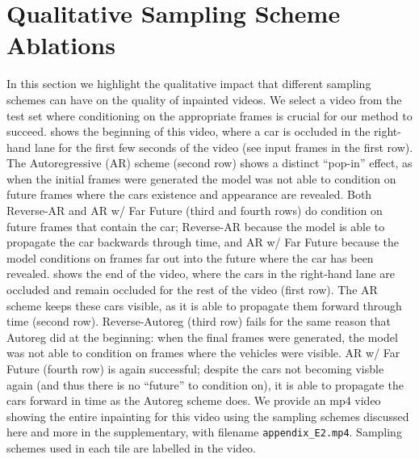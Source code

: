 \section{Qualitative Sampling Scheme Ablations}
\label{sec:quall}
In this section we highlight the qualitative impact that different sampling schemes can have on the quality of inpainted videos. We select a video from the test set where conditioning on the appropriate frames is crucial for our method to succeed.  shows the beginning of this video, where a car is occluded in the right-hand lane for the first few seconds of the video (see input frames in the first row). The Autoregressive (AR) scheme (second row) shows a distinct ``pop-in'' effect, as when the initial frames were generated the model was not able to condition on future frames where the cars existence and appearance are revealed. Both Reverse-AR and AR w/ Far Future (third and fourth rows) do condition on future frames that contain the car; Reverse-AR because the model is able to propagate the car backwards through time, and AR w/ Far Future because the model conditions on frames far out into the future where the car has been revealed.  shows the end of the video, where the cars in the right-hand lane are occluded and remain occluded for the rest of the video (first row). The AR scheme keeps these cars visible, as it is able to propagate them forward through time (second row). Reverse-Autoreg (third row) fails for the same reason that Autoreg did at the beginning: when the final frames were generated, the model was not able to condition on frames where the vehicles were visible. AR w/ Far Future (fourth row) is again successful; despite the cars not becoming visble again (and thus there is no ``future'' to condition on), it is able to propagate the cars forward in time as the Autoreg scheme does. We provide an mp4 video showing the entire inpainting for this video using the sampling schemes discussed here and more in the supplementary, with filename \texttt{appendix\_E2.mp4}. Sampling schemes used in each tile are labelled in the video.
